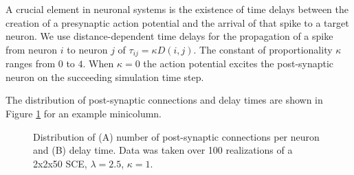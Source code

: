 A crucial element in neuronal systems is the existence of time delays between the creation of a presynaptic action potential and the arrival of that spike to a target neuron. 
We use distance-dependent time delays for the propagation of a spike from neuron $i$ to neuron $j$ of $\tau_{ij} = \kappa  D(i,j)$. 
The constant of proportionality $\kappa$ ranges from $0$ to $4$.
When $\kappa=0$ the action potential excites the post-synaptic neuron on the succeeding simulation time step.
 
The distribution of post-synaptic connections and delay times are shown in Figure \ref{fig:connection_delay_distrbution} for an example minicolumn.
\begin{figure}[!htb]
 \caption{Distribution of (A) number of post-synaptic connections per neuron and (B) delay time. Data was taken over 100 realizations of a 2x2x50 SCE, $\lambda=2.5$, $\kappa=1$.  } 
 \label{fig:connection_delay_distrbution}
\end{figure}
 \FloatBarrier

